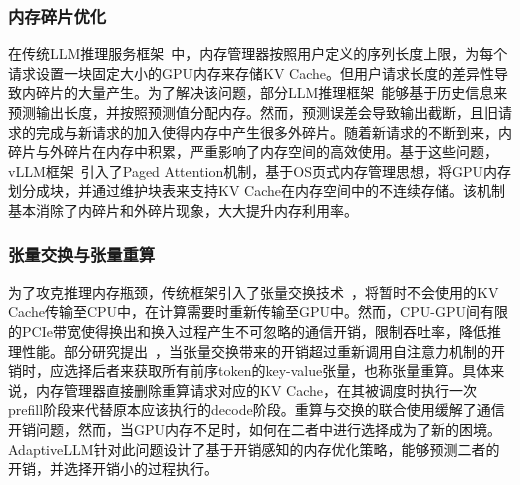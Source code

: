 \subsubsection{内存碎片优化}

在传统LLM推理服务框架~\cite{Swapping}中，内存管理器按照用户定义的序列长度上限，为每个请求设置一块固定大小的GPU内存来存储KV Cache。但用户请求长度的差异性导致内碎片的大量产生。为了解决该问题，部分LLM推理框架~\cite{Output-Length-Prediction}能够基于历史信息来预测输出长度，并按照预测值分配内存。然而，预测误差会导致输出截断，且旧请求的完成与新请求的加入使得内存中产生很多外碎片。随着新请求的不断到来，内碎片与外碎片在内存中积累，严重影响了内存空间的高效使用。基于这些问题，vLLM框架~\cite{vLLM}引入了Paged Attention机制，基于OS页式内存管理思想，将GPU内存划分成块，并通过维护块表来支持KV Cache在内存空间中的不连续存储。该机制基本消除了内碎片和外碎片现象，大大提升内存利用率。

\subsubsection{张量交换与张量重算}

为了攻克推理内存瓶颈，传统框架引入了张量交换技术~\cite{Swapping, vLLM, LightLLM}，将暂时不会使用的KV Cache传输至CPU中，在计算需要时重新传输至GPU中。然而，CPU-GPU间有限的PCIe带宽使得换出和换入过程产生不可忽略的通信开销，限制吞吐率，降低推理性能。部分研究提出~\cite{Recomputation}，当张量交换带来的开销超过重新调用自注意力机制的开销时，应选择后者来获取所有前序token的key-value张量，也称张量重算。具体来说，内存管理器直接删除重算请求对应的KV Cache，在其被调度时执行一次prefill阶段来代替原本应该执行的decode阶段。重算与交换的联合使用缓解了通信开销问题，然而，当GPU内存不足时，如何在二者中进行选择成为了新的困境。AdaptiveLLM针对此问题设计了基于开销感知的内存优化策略，能够预测二者的开销，并选择开销小的过程执行。
